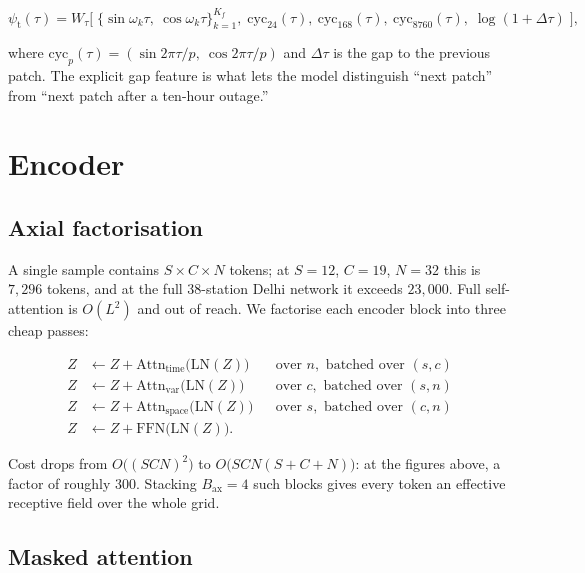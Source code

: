 \documentclass[11pt,a4paper]{article}
\begin{document}
\begin{equation}
\psi_{\text{t}}(\tau) = W_{\tau}\Big[\;
\{\sin \omega_k\tau,\ \cos\omega_k\tau\}_{k=1}^{K_f},\;
\text{cyc}_{24}(\tau),\ \text{cyc}_{168}(\tau),\ \text{cyc}_{8760}(\tau),\;
\log(1+\Delta\tau)\;\Big],
\end{equation}

where $\text{cyc}_{p}(\tau)=(\sin 2\pi\tau/p,\ \cos 2\pi\tau/p)$ and
$\Delta\tau$ is the gap to the previous patch. The explicit gap feature is what
lets the model distinguish ``next patch'' from ``next patch after a ten-hour
outage.''

\section{Encoder}

\subsection{Axial factorisation}

A single sample contains $S\!\times\!C\!\times\!N$ tokens; at $S=12$, $C=19$,
$N=32$ this is $7{,}296$ tokens, and at the full 38-station Delhi network it
exceeds $23{,}000$. Full self-attention is $O(L^2)$ and out of reach. We
factorise each encoder block into three cheap passes:

\begin{align}
Z &\leftarrow Z + \mathrm{Attn}_{\text{time}}\big(\mathrm{LN}(Z)\big)   && \text{over } n, \text{ batched over } (s,c) \\
Z &\leftarrow Z + \mathrm{Attn}_{\text{var}}\big(\mathrm{LN}(Z)\big)    && \text{over } c, \text{ batched over } (s,n) \\
Z &\leftarrow Z + \mathrm{Attn}_{\text{space}}\big(\mathrm{LN}(Z)\big)  && \text{over } s, \text{ batched over } (c,n) \\
Z &\leftarrow Z + \mathrm{FFN}\big(\mathrm{LN}(Z)\big).
\end{align}

Cost drops from $O\!\big((SCN)^2\big)$ to $O\!\big(SCN(S+C+N)\big)$: at the
figures above, a factor of roughly 300. Stacking $B_{\text{ax}}=4$ such blocks
gives every token an effective receptive field over the whole grid.

\subsection{Masked attention}
\end{document}
